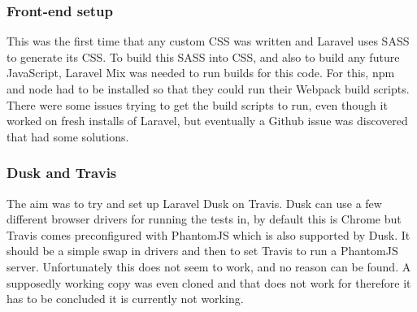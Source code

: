 \subsubsection{Front-end setup}
This was the first time that any custom CSS was written and Laravel uses SASS to generate its CSS. To build this SASS into CSS, and also to build any future JavaScript, Laravel Mix was needed to run builds for this code. For this, npm and node had to be installed so that they could run their Webpack build scripts. There were some issues trying to get the build scripts to run, even though it worked on fresh installs of Laravel, but eventually a Github issue was discovered that had some solutions\cite{broken-mix}.
\subsubsection{Dusk and Travis}
The aim was to try and set up Laravel Dusk on Travis. Dusk can use a few different browser drivers for running the tests in, by default this is Chrome but Travis comes preconfigured with PhantomJS which is also supported by Dusk. It should be a simple swap in drivers and then to set Travis to run a PhantomJS server. Unfortunately this does not seem to work, and no reason can be found. A supposedly working copy was even cloned and that does not work for therefore it has to be concluded it is currently not working.
\newpage

